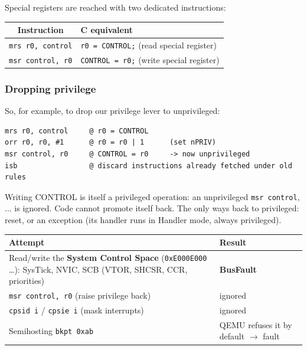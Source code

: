\documentclass[a4paper,11pt]{article}
\begin{document}
Special registers are reached with two dedicated instructions:

\begin{table}[h]
	\centering
	\begin{tabular}{c l}
		\hline
		\textbf{Instruction}     & \textbf{C equivalent}                                 \\
		\hline
		\texttt{mrs r0, control} & \texttt{r0 = CONTROL;} \quad (read special register)  \\
		\texttt{msr control, r0} & \texttt{CONTROL = r0;} \quad (write special register) \\
		\hline
	\end{tabular}
\end{table}

\subsubsection{Dropping privilege}

So, for example, to drop our privilege lever to unprivileged:
\begin{lstlisting}[language=arm, style=codestyle]	
mrs r0, control     @ r0 = CONTROL
orr r0, r0, #1      @ r0 = r0 | 1      (set nPRIV)
msr control, r0     @ CONTROL = r0     -> now unprivileged
isb                 @ discard instructions already fetched under old rules
\end{lstlisting}

Writing CONTROL is itself a privileged operation: an unprivileged \texttt{msr control}, ... is ignored. Code cannot promote itself back.
The only ways back to privileged: reset, or an exception (its handler runs in Handler mode, always privileged).

\begin{table}[H]
	\centering
	\begin{tabular}{p{10cm} p{5cm}}
		\hline
		\textbf{Attempt} & \textbf{Result}                                \\
		\hline
		Read/write the \textbf{System Control Space} (\texttt{0xE000E000} \ldots):
		SysTick, NVIC, SCB (VTOR, SHCSR, CCR, priorities)
		                 & \textbf{BusFault}                              \\

		\texttt{msr control, r0} (raise privilege back)
		                 & ignored                                        \\

		\texttt{cpsid i} / \texttt{cpsie i} (mask interrupts)
		                 & ignored                                        \\

		Semihosting \texttt{bkpt 0xab}
		                 & QEMU refuses it by default $\rightarrow$ fault \\
		\hline
	\end{tabular}
\end{table}
\end{document}

